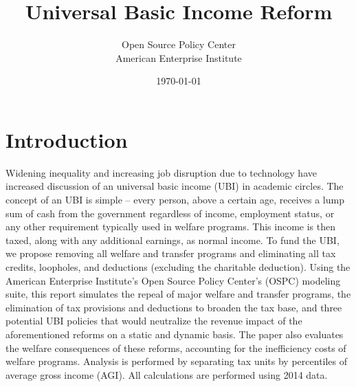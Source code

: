 \documentclass{article}
\begin{document}
\begin{titlepage}

\title{Universal Basic Income Reform}
\author{Open Source Policy Center \\ American Enterprise Institute}
\date{\today}

\maketitle

\end{titlepage}

\tableofcontents
\newpage

\doublespacing

\section{Introduction}

%

Widening inequality and increasing job disruption due to technology have increased discussion of an universal basic income (UBI) in academic circles. The concept of an UBI is simple -- every person, above a certain age, receives a lump sum of cash from the government regardless of income, employment status, or any other requirement typically used in welfare programs. This income is then taxed, along with any additional earnings, as normal income. To fund the UBI, we propose removing all welfare and transfer programs and eliminating all tax credits, loopholes, and deductions (excluding the charitable deduction). Using the American Enterprise Institute's Open Source Policy Center's (OSPC) modeling suite, this report simulates the repeal of major welfare and transfer programs, the elimination of tax provisions and deductions to broaden the tax base, and three potential UBI policies that would neutralize the revenue impact of the aforementioned reforms on a static and dynamic basis. The paper also evaluates the welfare consequences of these reforms, accounting for the inefficiency costs of welfare programs. Analysis is performed by separating tax units by percentiles of average gross income (AGI). All calculations are performed using 2014 data.
\end{document}
